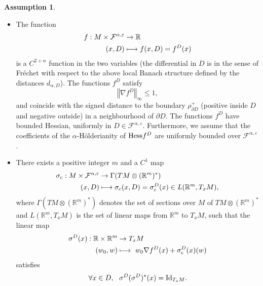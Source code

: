 \documentclass[10pt]{amsart}
\newcommand\mto{\mathchoice{\longmapsto}{\mapsto}{\mapsto}{\mapsto}}
\theoremstyle{plain}
\theoremstyle{definition}
\newtheorem{assumption}[thm]{Assumption}
\newcommand{\RR}{{\mathbb R}}
\newcommand{\lVe}{\lt\Vert}
\newcommand{\rVe}{\rt\Vert}
\newcommand{\lt}{\left}
\newcommand{\rt}{\right}
\newcommand{\barD}{D}
\let\a\alpha
\let\e\varepsilon
\let\n\nabla
\let\s\sigma
\newcommand{\cF}{\mathcal{F}}
\begin{document}
\skpt
\begin{assumption}
\label{A6.1}
\begin{itemize}
\item The function
\begin{align*}
f: M\times \cF^{\alpha,\e}&\to \RR\\
(x,D)&\mto f(x,D)=f^D(x)
\end{align*}
is a $C^{2+\a}$ function in the two variables ({the differential in $D$ is in the sense of Fréchet} with respect to the above local Banach structure defined by the distances $d_{\a, D}$).
The functions $f^D$ satisfy
\begin{equation}
\lVe \n f^D\rVe_{\infty}\leq 1,
\end{equation}
and coincide with the signed distance to the boundary $\rho_{\partial D}^+$ (positive inside $D$ and negative outside) in a neighbourhood of $\partial D$.
The functions $f^D$ have bounded Hessian, uniformly in $D\in\cF^{\a,\e}$.
Furthermore, we assume that the coefficients of the $\alpha$-Hölderianity of ${\rm Hess} f^D$ are uniformly bounded over $\cF^{\a,\e}$.
\item
There exists a positive integer $m$ and a $C^1$ map
\begin{align*}
\s_c: M\times \cF^{\alpha,\e}&\to \Gamma(TM\otimes (\RR^m)^\ast)\\
(x,D)&\mto \s_c(x,D)=\s_c^D(x)\in L(\RR^m,T_xM),
\end{align*}
where $\Gamma(TM\otimes (\RR^m)^\ast)$ denotes the set of sections over $M$ of $TM\otimes (\RR^m)^\ast$ and
$L(\RR^m,T_xM)$ is the set of linear maps from $\RR^m$ to $T_xM$,
such that the linear map
\begin{equation}
\begin{split}
\s^D(x): \RR\times \RR^m&\to T_xM \\
(w_0, w)&\mto\ w_0\n f^D(x)+ \sigma_{\mathrm c}^D(x)(w)
\end{split}
\end{equation}
satisfies
\begin{equation}
\forall x\in \barD, \ \ \s^D(\s^D)^\ast (x)={\rm Id}_{T_xM}.
\end{equation}
\end{itemize}
\end{assumption}
\end{document}

